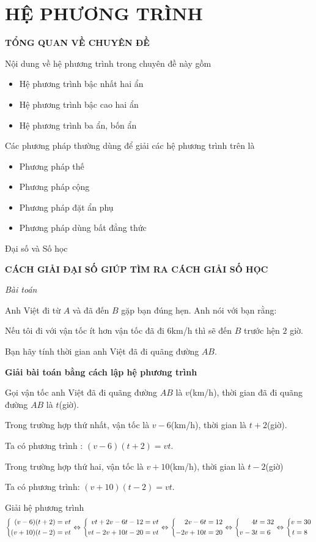 \section{HỆ PHƯƠNG TRÌNH}

\begin{center}
 \large \textbf{TỔNG QUAN VỀ CHUYÊN ĐỀ}
\end{center}
Nội dung về hệ phương trình trong chuyên đề này gồm
\begin{itemize}
\item Hệ phương trình bậc nhất hai ẩn
\item Hệ phương trình bậc cao hai ẩn
\item Hệ phương trình ba ẩn, bốn ẩn
\end{itemize}
Các phương pháp thường dùng để giải các hệ phương trình trên là
\begin{itemize}
\item Phương pháp thế
\item Phương pháp cộng
\item Phương pháp đặt ẩn phụ
\item Phương pháp dùng bất đẳng thức
\end{itemize}
Đại số và Số học
\begin{center}
\large \textbf{CÁCH GIẢI ĐẠI SỐ GIÚP TÌM RA CÁCH GIẢI SỐ HỌC}
\end{center}
\textit{Bài toán}


Anh Việt đi từ $A$ và đã đến $B$ gặp bạn đúng hẹn. Anh nói với bạn rằng:

Nếu tôi đi với vận tốc ít hơn vận tốc đã đi $6$km/h thì sẽ đến $B$ trước hện $2$ giờ.

Bạn hãy tính thời gian anh Việt đã đi quãng đường
$AB$.

\textbf{Giải bài toán bằng cách lập hệ phương trình}

Gọi vận tốc anh Việt đã đi quãng đường $AB$ là $v$(km/h), thời gian đã đi quãng đường $AB$ là $t$(giờ).

Trong trường hợp thứ nhất, vận tốc là $v-6$(km/h), thời gian là $t+2$(giờ).

Ta có phương trình : $(v-6)(t+2)=vt$.

Trong trường hợp thứ hai, vận tốc là $v+10$(km/h), thời gian là $t-2$(giờ)

Ta có phương trình: $(v+10)(t-2)=vt$.

Giải hệ phương trình
\begin{align*}
\left\{\begin{aligned}(v-6)(t+2)&=vt\\(v+10)(t-2)&=vt\end{aligned}\right. \Leftrightarrow \left\{\begin{aligned}vt+2v-6t-12&=vt\\vt-2v+10t-20&=vt\end{aligned}\right. \Leftrightarrow \left\{\begin{aligned}2v-6t&=12\\-2v+10t&=20\end{aligned}\right.\Leftrightarrow \left\{\begin{aligned}4t&=32\\v-3t&=6\end{aligned}\right.\Leftrightarrow \left\{\begin{aligned}v&=30\\t&=8\end{aligned}\right.
\end{align*}

